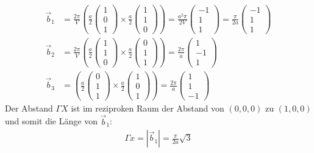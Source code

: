 \begin{align*}
\vec{b}_1 &= \frac{2\pi}{V}\left(\frac{a}{2}\begin{pmatrix}1\\0\\1\end{pmatrix}\times\frac{a}{2}\begin{pmatrix}1\\1\\0\end{pmatrix}\right) = \frac{a^2\pi}{2V}\begin{pmatrix}-1\\1\\1\end{pmatrix} = \frac{\pi}{2a}\begin{pmatrix}-1\\1\\1\end{pmatrix} \\
\vec{b}_2 &= \frac{2\pi}{V}\left(\frac{a}{2}\begin{pmatrix}1\\1\\0\end{pmatrix}\times\frac{a}{2}\begin{pmatrix}0\\1\\1\end{pmatrix}\right) = \frac{2\pi}{a}\begin{pmatrix}1\\-1\\1\end{pmatrix}\\
\vec{b}_3 &= \left(\frac{a}{2}\begin{pmatrix}0\\1\\1\end{pmatrix}\times\frac{a}{2}\begin{pmatrix}1\\0\\1\end{pmatrix}\right) = \frac{2\pi}{a}\begin{pmatrix}1\\1\\-1\end{pmatrix}
\end{align*}
Der Abstand $\Gamma X$ ist im reziproken Raum der Abstand von $(0,0,0)$ zu $(1,0,0)$ und somit die Länge von $\vec{b}_1$:
\begin{align*}
\Gamma x = |\vec{b}_1| = \frac{\pi}{2a}\sqrt{3}
\end{align*}


